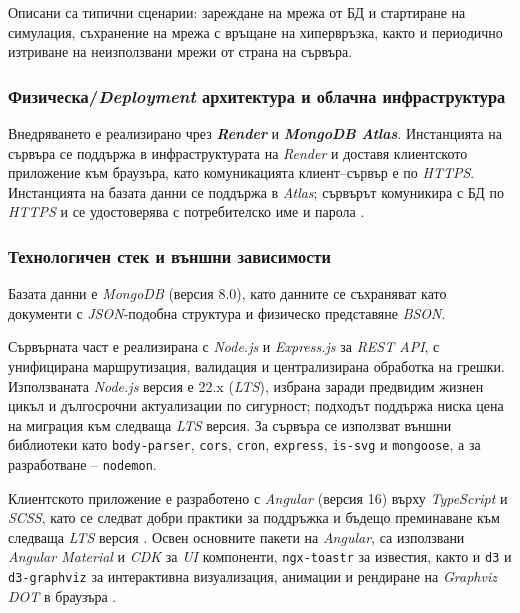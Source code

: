 Описани са типични сценарии: зареждане на мрежа от БД и стартиране на симулация, съхранение на мрежа с връщане на хипервръзка, както и периодично изтриване на неизползвани мрежи от страна на сървъра.

\subsubsection{Физическа/\textit{Deployment} архитектура и облачна инфраструктура}
\hspace*{2.5em}Внедряването е реализирано чрез \textbf{\textit{Render}} и \textbf{\textit{MongoDB Atlas}}. Инстанцията на сървъра се поддържа в инфраструктурата на \textit{Render} и доставя клиентското приложение към браузъра, като комуникацията клиент--сървър е по \textit{HTTPS}. Инстанцията на базата данни се поддържа в \textit{Atlas}; сървърът комуникира с БД по \textit{HTTPS} и се удостоверява с потребителско име и парола \cite{DIS-RenderWebServices,MongoDBAtlasDocs}.

\subsubsection{Технологичен стек и външни зависимости}
\hspace*{2.5em}Базата данни е \textit{MongoDB} (версия 8.0), като данните се съхраняват като документи с \textit{JSON}-подобна структура и физическо представяне \textit{BSON}.

Сървърната част е реализирана с \textit{Node.js} и \textit{Express.js} за \textit{REST API}, с унифицирана маршрутизация, валидация и централизирана обработка на грешки. Използваната \textit{Node.js} версия е 22.x (\textit{LTS}), избрана заради предвидим жизнен цикъл и дългосрочни актуализации по сигурност; подходът поддържа ниска цена на миграция към следваща \textit{LTS} версия. За сървъра се използват външни библиотеки като \texttt{body-parser}, \texttt{cors}, \texttt{cron}, \texttt{express}, \texttt{is-svg} и \texttt{mongoose}, а за разработване -- \texttt{nodemon}.

Клиентското приложение е разработено с \textit{Angular} (версия 16) върху \textit{TypeScript} и \textit{SCSS}, като се следват добри практики за поддръжка и бъдещо преминаване към следваща \textit{LTS} версия \cite{DIS-AngularDocs,DIS-TypeScriptHandbook}. Освен основните пакети на \textit{Angular}, са използвани \textit{Angular Material} и \textit{CDK} за \textit{UI} компоненти, \texttt{ngx-toastr} за известия, както и \texttt{d3} и \texttt{d3-graphviz} за интерактивна визуализация, анимации и рендиране на \textit{Graphviz DOT} в браузъра \cite{DIS-D3Transition}.

